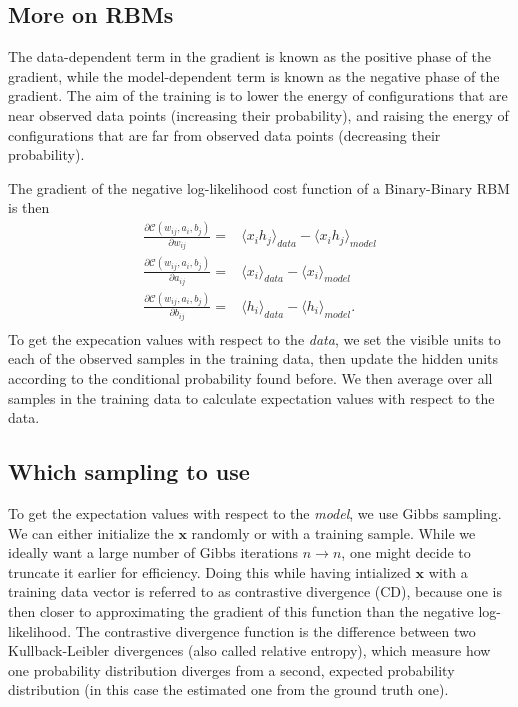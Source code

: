 \documentclass[%
oneside,                 %
final,                   %
10pt]{article}
\begin{document}
\subsection{More on RBMs}

The data-dependent term in the gradient is known as the positive phase of the gradient, while the model-dependent term is known as the negative phase of the gradient. The aim of the training is to lower the energy of configurations that are near observed data points (increasing their probability), and raising the energy of configurations that are far from observed data points (decreasing their probability).

The gradient of the negative log-likelihood cost function of a Binary-Binary RBM is then
\begin{align}
	\frac{\partial \mathcal{C} (w_{ij}, a_i, b_j)}{\partial w_{ij}} =& \langle x_i h_j \rangle_{data} - \langle x_i h_j \rangle_{model} \\
	\frac{\partial \mathcal{C} (w_{ij}, a_i, b_j)}{\partial a_{ij}} =& \langle x_i \rangle_{data} - \langle x_i \rangle_{model} \\
	\frac{\partial \mathcal{C} (w_{ij}, a_i, b_j)}{\partial b_{ij}} =& \langle h_i \rangle_{data} - \langle h_i \rangle_{model}. \\
\end{align}
To get the expecation values with respect to the \emph{data}, we set the visible units to each of the observed samples in the training data, then update the hidden units according to the conditional probability found before. We then average over all samples in the training data to calculate expectation values with respect to the data. 

\subsection{Which sampling to use}

To get the expectation values with respect to the \emph{model}, we use Gibbs sampling. We can either initialize the $\bm{x}$ randomly or with a training sample. While we ideally want a large number of Gibbs iterations $n\rightarrow n$, one might decide to truncate it earlier for efficiency. Doing this while having intialized $\bm{x}$ with a training data vector is referred to as contrastive divergence (CD), because one is then closer to approximating the gradient of this function than the negative log-likelihood. The contrastive divergence function is the difference between two Kullback-Leibler divergences (also called relative entropy), which measure how one probability distribution diverges from a second, expected probability distribution (in this case the estimated one from the ground truth one).
\end{document}
